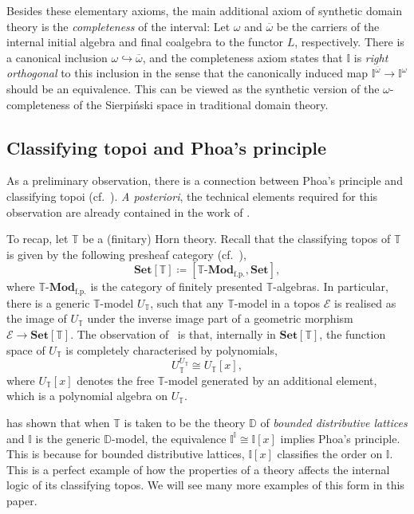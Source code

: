 \documentclass[a4paper,12pt]{amsart}
\theoremstyle{definition}
\newcommand{\mc}[1]{\mathcal{#1}}
\newcommand{\mb}[1]{\mathbf{#1}}
\newcommand{\mbb}[1]{\mathbb{#1}}
\newcommand{\T}{\mbb T}
\newcommand{\I}{\mbb I}
\newcommand{\mr}[1]{\mathrm{#1}}
\newcommand{\Set}{\mb{Set}}
\newcommand{\ov}[1]{\overline{#1}}
\newcommand{\hook}{\hookrightarrow}
\newcommand{\fp}{_{\mr{f.p.}}}
\newcommand{\mmod}[1]{#1\text{-}\mathbf{Mod}}
\begin{document}
Besides these elementary axioms, the main additional axiom of synthetic domain theory is the \emph{completeness} of the interval: Let $\omega$ and $\ov\omega$ be the carriers of the internal initial algebra and final coalgebra to the functor $L$, respectively. 
There is a canonical inclusion $\omega \hook \ov\omega$, and the completeness axiom states that $\I$ is \emph{right orthogonal} to this inclusion in the sense that the canonically induced map $\I^{\ov\omega} \to \I^{\omega}$ should be an equivalence. This can be viewed as the synthetic version of the $\omega$-completeness of the Sierpi\'nski space in traditional domain theory.

\subsection{Classifying topoi and Phoa's principle}\label{subsec:classtopphoa}

As a preliminary observation, there is a connection between Phoa's principle and classifying topoi (cf.~\cite[Lem 3.8]{gratzer2024directed}).
\emph{A posteriori}, the technical elements required for this observation are already contained in the work of \citet{RN879}.

To recap, let $\T$ be a (finitary) Horn theory. Recall that the classifying topos of $\T$ is given by the following presheaf category (cf.~\cite[D3.1]{johnstone2002sketches}),
\[ \Set[\T] \coloneq [\mmod\T\fp,\Set], \]
where $\mmod\T\fp$ is the category of finitely presented $\T$-algebras. In particular, there is a generic $\T$-model $U_\T$, such that any $\T$-model in a topos $\mc E$ is realised as the image of $U_\T$ under the inverse image part of a geometric morphism $\mc E \to \Set[\T]$. The observation of~\cite{RN879} is that, internally in $\Set[\T]$, the function space of $U_\T$ is completely characterised by polynomials,
\[ U_\T^{U_\T} \cong U_\T[x], \]
where $U_\T[x]$ denotes the free $\T$-model generated by an additional element, which is a  polynomial algebra on $U_\T$.

\citet{gratzer2024directed} has shown that when $\T$ is taken to be the theory $\mbb D$ of \emph{bounded distributive lattices} and $\I$ is the generic $\mbb D$-model, the equivalence $\I^\I \cong \I[x]$ implies Phoa's principle. This is because for bounded distributive lattices, $\I[x]$ classifies the order on $\I$. This is a perfect example of how the properties of a theory affects the internal logic of its classifying topos. We will see many more examples of this form in this paper.
\end{document}
